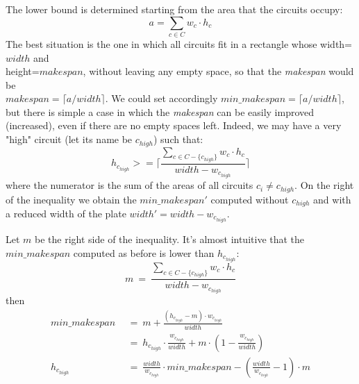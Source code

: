         The lower bound is determined starting from the area that the circuits occupy: 
        \begin{equation*}
            a = \sum_{c \in C} w_c \cdot h_c
        \end{equation*}
        The best situation is the one in which all circuits fit in a rectangle whose width=$width$ and \\
        height=$makespan$, without leaving any empty space, so that the \textit{makespan} would be \\
        $makespan = \lceil a / width \rceil$. 
        We could set accordingly $min\_makespan = \lceil a / width \rceil$, but there is simple a case in which
        the \textit{makespan} can be easily improved (increased), even if there are no empty spaces left. 
        Indeed, we may have a very "high" circuit (let its name be $c_{high}$) such that:
        \begin{equation}
            h_{c_{high}} >= \lceil \frac{\sum_{c \in C - \{c_{high}\}} w_c \cdot h_c}{width - w_{c_{high}}} \rceil
            \label{eq:h_high}
        \end{equation}
        where the numerator is the sum of the areas of all circuits $c_i \neq c_{high}$. On the right of
        the inequality we obtain the $min\_makespan'$ computed without $c_{high}$ and with a reduced width of the plate 
        $width' = width - w_{c_{high}}$.

        Let $m$ be the right side of the inequality. It's almost intuitive that the $min\_makespan$ computed
        as before is lower than $h_{c_{high}}$:
        \begin{equation}
            m\ =\ \frac{\sum_{c \in C - \{c_{high}\}} w_c \cdot h_c}{width - w_{c_{high}}}
            \label{eq:m}
        \end{equation}
        then
        \begin{align*}
            min\_makespan\  &\ =\ m + \frac{(h_{c_{high}} - m) \cdot w_{c_{high}}}{width}                                               \\
                            &\ =\ h_{c_{high}} \cdot \frac{w_{c_{high}}}{width} + m \cdot \left(1 - \frac{w_{c_{high}}}{width}\right)   \\
            h_{c_{high}}\   &\ =\ \frac{width}{w_{c_{high}}} \cdot min\_makespan - \left( \frac{width}{w_{c_{high}}} - 1\right) \cdot m
        \end{align*}

